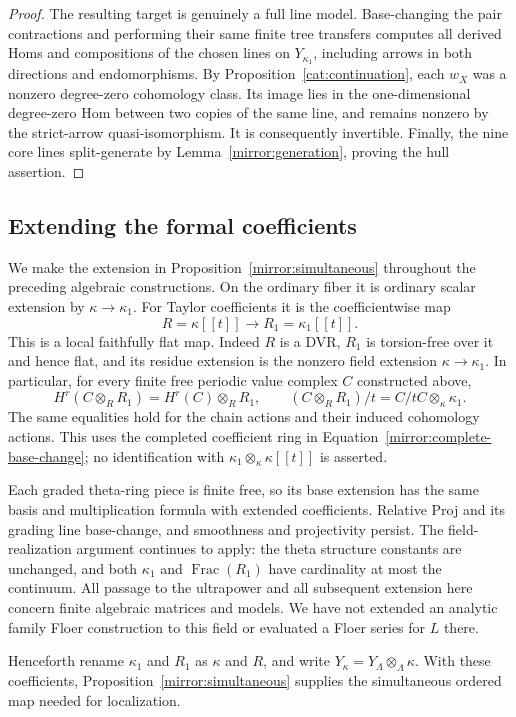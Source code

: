 \begin{proof}
The resulting target is genuinely a full line model.  Base-changing
the pair contractions and performing their same finite tree
transfers computes all derived Homs and compositions of the chosen
lines on $Y_{\kappa_1}$, including arrows in both directions and
endomorphisms.  By Proposition~\ref{cat:continuation}, each $w_X$
was a nonzero degree-zero cohomology class.
Its image lies in the one-dimensional degree-zero Hom between two
copies of the same line, and remains nonzero by the strict-arrow
quasi-isomorphism.  It is consequently invertible.  Finally, the
nine core lines split-generate by Lemma~\ref{mirror:generation},
proving the hull assertion.
\end{proof}

\subsection{Extending the formal coefficients}

We make the extension in Proposition~\ref{mirror:simultaneous}
throughout the preceding algebraic constructions.  On the ordinary
fiber it is ordinary scalar extension by $\kappa\to\kappa_1$.
For Taylor coefficients it is the coefficientwise map
\begin{equation}
 R=\kappa[[t]]\longrightarrow R_1=\kappa_1[[t]].
 \label{mirror:complete-base-change}
\end{equation}
This is a local faithfully flat map.  Indeed $R$ is a DVR, $R_1$
is torsion-free over it and hence flat, and its residue extension
is the nonzero field extension $\kappa\to\kappa_1$.  In particular,
for every finite free periodic value complex $C$ constructed above,
\[
 H^r(C\otimes_RR_1)=H^r(C)\otimes_RR_1,
 \qquad
 (C\otimes_RR_1)/t=C/tC\otimes_\kappa\kappa_1.
\]
The same equalities hold for the chain actions and their induced
cohomology actions.  This uses the completed coefficient ring in
Equation~\eqref{mirror:complete-base-change}; no identification with
$\kappa_1\otimes_\kappa\kappa[[t]]$ is asserted.

Each graded theta-ring piece is finite free, so its base extension
has the same basis and multiplication formula with extended
coefficients.  Relative Proj and its grading line base-change, and
smoothness and projectivity persist.  The field-realization argument
continues to apply: the theta structure constants are unchanged,
and both $\kappa_1$ and $\operatorname{Frac}(R_1)$ have cardinality
at most the continuum.  All passage to the ultrapower and all
subsequent extension here concern finite algebraic matrices and
models.  We have not extended an analytic family Floer construction
to this field or evaluated a Floer series for $L$ there.

Henceforth rename $\kappa_1$ and $R_1$ as $\kappa$ and $R$, and
write $Y_\kappa=Y_\Lambda\otimes_\Lambda\kappa$.  With these
coefficients, Proposition~\ref{mirror:simultaneous} supplies the
simultaneous ordered map needed for localization.

